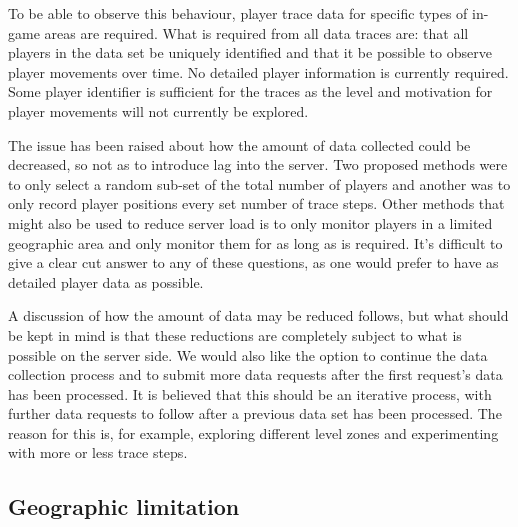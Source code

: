 \documentclass[journal,oneside,a4paper,onecolumn]{IEEEtran}
\begin{document}
To be able to observe this behaviour, player trace data for specific types of in-game areas are required. What is required from all data traces are:
that all players in the data set be uniquely identified and that it be possible to observe player movements over time. No detailed player information
is currently required. Some player identifier is sufficient for the traces as the level and motivation for player movements will not currently be
explored.

The issue has been raised about how the amount of data collected could be decreased, so not as to introduce lag into the server. Two proposed methods
were to only select a random sub-set of the total number of players and another was to only record player positions every set number of trace steps.
Other methods that might also be used to reduce server load is to only monitor players in a limited geographic area and only monitor them for as long
as is required. It's difficult to give a clear cut answer to any of these questions, as one would prefer to have as detailed player data as possible.

A discussion of how the amount of data may be reduced follows, but what should be kept in mind is that these reductions are completely subject to
what is possible on the server side. We would also like the option to continue the data collection process and to submit more data requests after the
first request's data has been processed. It is believed that this should be an iterative process, with further data requests to follow after a
previous data set has been processed. The reason for this is, for example, exploring different level zones and experimenting with more or less trace
steps.

\subsection{Geographic limitation}
\end{document}
